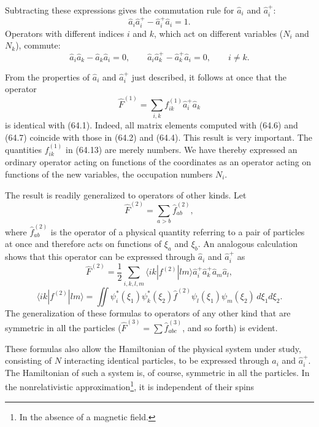 Subtracting these expressions gives the commutation rule for $\hat a_i$ and
$\hat a_i^+$:
\begin{equation}
 \hat a_i\hat a_i^+-\hat a_i^+\hat a_i=1.
 \tag{64.11}
\end{equation}
Operators with different indices $i$ and $k$, which act on different
variables ($N_i$ and $N_k$), commute:
\begin{equation}
 \hat a_i\hat a_k-\hat a_k\hat a_i=0,\qquad
 \hat a_i\hat a_k^+-\hat a_k^+\hat a_i=0,\qquad i\ne k.
 \tag{64.12}
\end{equation}

From the properties of $\hat a_i$ and $\hat a_i^+$ just described, it follows
at once that the operator
\begin{equation}
 \hat F^{(1)}=\sum_{i,k}f_{ik}^{(1)}\hat a_i^+\hat a_k
 \tag{64.13}
\end{equation}
is identical with (64.1). Indeed, all matrix elements computed with (64.6)
and (64.7) coincide with those in (64.2) and (64.4). This result is very
important. The quantities $f_{ik}^{(1)}$ in (64.13) are merely numbers. We
have thereby expressed an ordinary operator acting on functions of the
coordinates as an operator acting on functions of the new variables, the
occupation numbers $N_i$.

The result is readily generalized to operators of other kinds. Let
\begin{equation}
 \hat F^{(2)}=\sum_{a>b}\hat f_{ab}^{(2)},
 \tag{64.14}
\end{equation}
where $\hat f_{ab}^{(2)}$ is the operator of a physical quantity referring to
a pair of particles at once and therefore acts on functions of $\xi_a$ and
$\xi_b$. An analogous calculation shows that this operator can be expressed
through $\hat a_i$ and $\hat a_i^+$ as
\begin{equation}
 \hat F^{(2)}=\frac12\sum_{i,k,l,m}
 \langle ik|f^{(2)}|lm\rangle\hat a_i^+\hat a_k^+\hat a_m\hat a_l,
 \tag{64.15}
\end{equation}
\[
 \langle ik|f^{(2)}|lm\rangle=\iint
 \psi_i^*(\xi_1)\psi_k^*(\xi_2)\hat f^{(2)}
 \psi_l(\xi_1)\psi_m(\xi_2)\,d\xi_1d\xi_2.
\]
The generalization of these formulas to operators of any other kind that are
symmetric in all the particles ($\hat F^{(3)}=\sum\hat f_{abc}^{(3)}$, and so
forth) is evident.

These formulas also allow the Hamiltonian of the physical system under study,
consisting of $N$ interacting identical particles, to be expressed through
$\hat a_i$ and $\hat a_i^+$. The Hamiltonian of such a system is, of course,
symmetric in all the particles. In the nonrelativistic
approximation\footnote{In the absence of a magnetic field.}, it is independent
of their spins

